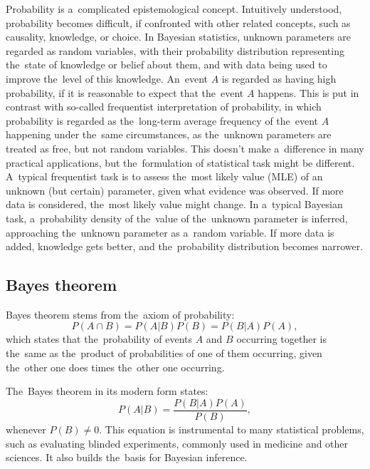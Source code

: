 Probability is a~complicated epistemological concept. Intuitively understood, probability becomes difficult, if confronted with other related concepts, such as causality, knowledge, or choice. In Bayesian statistics, unknown parameters are regarded as random variables, with their probability distribution representing the~state of knowledge or belief about them, and with data being used to improve the~level of this knowledge. An~event $A$ is regarded as having high probability, if it is reasonable to expect that the~event $A$ happens. This is put in contrast with so-called frequentist interpretation of probability, in which probability is regarded as the~long-term average frequency of the~event $A$ happening under the~same circumstances, as the~unknown parameters are treated as free, but not random variables. This doesn't make a~difference in many practical applications, but the~formulation of statistical task might be different. A~typical frequentist task is to assess the~most likely value (MLE) of an unknown (but certain) parameter, given what evidence was observed. If more data is considered, the~most likely value might change. In a~typical Bayesian task, a~probability density of the~value of the~unknown parameter is inferred, approaching the~unknown parameter as a~random variable. If more data is added, knowledge gets better, and the~probability distribution becomes narrower.

\subsection{Bayes theorem}

Bayes theorem stems from the~axiom of probability:
\begin{equation}
    P(A \cap B) = P(A|B)P(B) = P(B|A)P(A),
\end{equation}
which states that the~probability of events $A$ and $B$ occurring together is the~same as the~product of probabilities of one of them occurring, given the~other one does times the~other one occurring. 

The~Bayes theorem  \citep{bayes1763essay} in its modern form states:
\begin{equation}
    P(A|B) = \frac{P(B|A)P(A)}{P(B)},
    \label{eq:bayes_theorem}
\end{equation}
whenever $P(B) \neq 0$. This equation is instrumental to many statistical problems, such as evaluating blinded experiments, commonly used in medicine and other sciences. It also builds the~basis for Bayesian inference.

